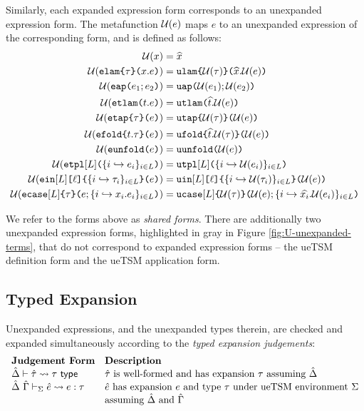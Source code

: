 Similarly, each expanded expression form corresponds to an unexpanded expression form. The metafunction $\mathcal{U}(e)$ maps $e$ to an unexpanded expression of the corresponding form, and is defined as follows:
\begin{align*}
\mathcal{U}(x) & = \widehat{x}\\
\mathcal{U}(\texttt{elam}\texttt{\{}\tau\texttt{\}(}x.e\texttt{)}) & = \texttt{ulam}\texttt{\{}\mathcal{U}(\tau)\texttt{\}(}\widehat{x}.\mathcal{U}(e)\texttt{)}\\
\mathcal{U}(\texttt{eap}\texttt{(}e_1; e_2\texttt{)}) & = \texttt{uap}\texttt{(}\mathcal{U}(e_1); \mathcal{U}(e_2)\texttt{)}\\
\mathcal{U}(\texttt{etlam}\texttt{(}t.e\texttt{)}) & = \texttt{utlam}\texttt{(}\widehat{t}.\mathcal{U}(e)\texttt{)}\\
\mathcal{U}(\texttt{etap}\texttt{\{}\tau\texttt{\}(}e\texttt{)}) & = \texttt{utap}\texttt{\{}\mathcal{U}(\tau)\texttt{\}(}\mathcal{U}(e)\texttt{)}\\
\mathcal{U}(\texttt{efold}\texttt{\{}t.\tau\texttt{\}(}e\texttt{)}) & = \texttt{ufold}\texttt{\{}\widehat{t}.\mathcal{U}(\tau)\texttt{\}(}\mathcal{U}(e)\texttt{)}\\
\mathcal{U}(\texttt{eunfold}\texttt{(}e\texttt{)}) & = \texttt{uunfold}\texttt{(}\mathcal{U}(e)\texttt{)}\\
\mathcal{U}(\texttt{etpl}[L]\texttt{(}\{i \hookrightarrow e_{i}\}_{i \in L}\texttt{)}) & = \texttt{utpl}[L]\texttt{(}\{i \hookrightarrow \mathcal{U}(e_{i})\}_{i \in L}\texttt{)}\\
\mathcal{U}(\texttt{ein}[L]\texttt{[}\ell\texttt{]\{}\{i \hookrightarrow \tau_{i}\}_{i \in L}\texttt{\}(}e\texttt{)}) &= \texttt{uin}[L]\texttt{[}\ell\texttt{]\{}\{i \hookrightarrow \mathcal{U}(\tau_{i})\}_{i \in L}\texttt{\}(}\mathcal{U}(e)\texttt{)}\\
\mathcal{U}(\texttt{ecase}[L]\texttt{\{}\tau\texttt{\}(}e; \{i \hookrightarrow x_{i}.e_{i}\}_{i \in L}\texttt{)}) & = \texttt{ucase}[L]\texttt{\{}\mathcal{U}(\tau)\texttt{\}(}\mathcal{U}(e); \{i \hookrightarrow \widehat{x_{i}}.\mathcal{U}(e_{i})\}_{i \in L}\texttt{)}
\end{align*}

We refer to the forms above as \emph{shared forms}. There are additionally two unexpanded expression forms, highlighted in gray in Figure \ref{fig:U-unexpanded-terms}, that do not correspond to expanded expression forms -- the ueTSM definition form and the ueTSM application form. %


\subsection{Typed Expansion}\label{sec:typed-expansion-U}
Unexpanded expressions, and the unexpanded types therein, are checked and expanded simultaneously according to the \emph{typed expansion judgements}:
\[\begin{array}{ll}
\textbf{Judgement Form} & \textbf{Description}\\
\hat{\Delta} \vdash {\hat\tau} \leadsto \tau~\mathsf{type} & \text{${\hat\tau}$ is well-formed and has expansion $\tau$ assuming $\hat{\Delta}$}\\
\hat{\Delta}~\hat{\Gamma} \vdash_{\Sigma} {\hat e} \leadsto e : \tau & \text{${\hat e}$ has expansion $e$ and type $\tau$ under ueTSM environment $\Sigma$}\\
& \text{assuming $\hat{\Delta}$ and $\hat{\Gamma}$}
\end{array}\]

